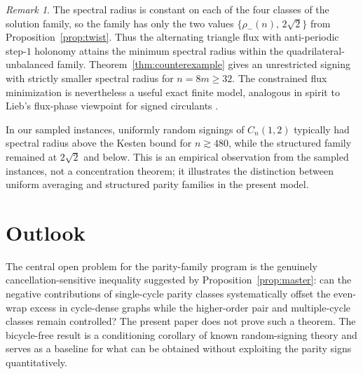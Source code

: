 \documentclass[11pt]{article}
\theoremstyle{remark}
\newtheorem{remark}[lemma]{Remark}
\begin{document}
\begin{remark}
The spectral radius is constant on each of the four classes of the
solution family, so the family has only the two values
$\{\rho_-(n),\,2\sqrt2\}$ from Proposition~\ref{prop:twist}. Thus the
alternating triangle flux with anti-periodic step-$1$ holonomy attains
the minimum spectral radius within the quadrilateral-unbalanced family.
Theorem~\ref{thm:counterexample} gives an unrestricted signing with strictly
smaller spectral radius for $n=8m\ge32$. The constrained flux minimization
is nevertheless a useful exact finite model, analogous in spirit to
Lieb's flux-phase viewpoint for signed circulants \cite{lieb94}.


In our sampled instances, uniformly random signings of $C_n(1,2)$ typically had
spectral radius above the Kesten bound for $n\gtrsim480$, while the structured family
remained at $2\sqrt2$ and below. This is an empirical observation from the sampled
instances, not a concentration theorem; it illustrates the distinction between
uniform averaging and structured parity families in the present model.
\end{remark}


\section{Outlook}

The central open problem for the parity-family program is the genuinely
cancellation-sensitive inequality suggested by Proposition~\ref{prop:master}: can the
negative contributions of single-cycle parity classes systematically offset the even-wrap
excess in cycle-dense graphs while the higher-order pair and multiple-cycle classes remain
controlled? The present paper does not prove such a theorem. The bicycle-free result is a
conditioning corollary of known random-signing theory and serves as a baseline for what can
be obtained without exploiting the parity signs quantitatively.
\end{document}
